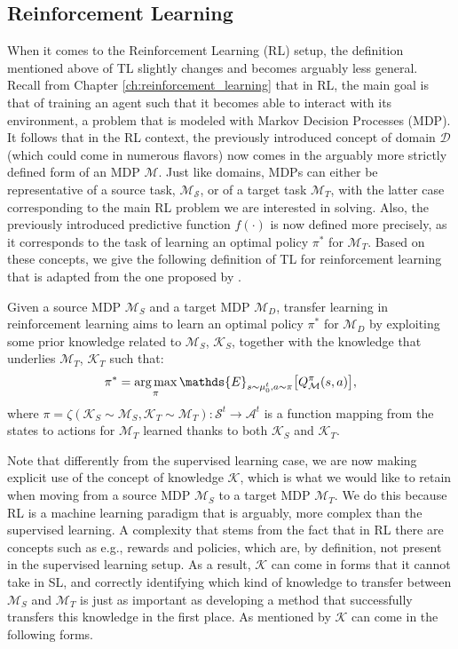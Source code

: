 \subsection{Reinforcement Learning}
\label{sec:reinforcement_learning_tl}
When it comes to the Reinforcement Learning (RL) setup, the definition mentioned above of TL slightly changes and becomes arguably less general. Recall from Chapter \ref{ch:reinforcement_learning} that in RL, the main goal is that of training an agent such that it becomes able to interact with its environment, a problem that is modeled with Markov Decision Processes (MDP). It follows that in the RL context, the previously introduced concept of domain $\mathcal{D}$ (which could come in numerous flavors) now comes in the arguably more strictly defined form of an MDP $\mathcal{M}$. Just like domains, MDPs can either be representative of a source task, $\mathcal{M_S}$, or of a target task $\mathcal{M}_T$, with the latter case corresponding to the main RL problem we are interested in solving. Also, the previously introduced predictive function $f(\cdot)$ is now defined more precisely, as it corresponds to the task of learning an optimal policy $\pi^*$ for $\mathcal{M}_T$. Based on these concepts, we give the following definition of TL for reinforcement learning that is adapted from the one proposed by \citet{zhu2020transfer}.

\begin{definition}
	Given a source MDP $\mathcal{M}_S$ and a target MDP $\mathcal{M}_D$, transfer learning in reinforcement learning aims to learn an optimal policy $\pi^{*}$ for $\mathcal{M}_D$ by exploiting some prior knowledge related to $\mathcal{M}_S$, $\mathcal{K}_S$, together with the knowledge that underlies $\mathcal{M}_T$, $\mathcal{K}_T$ such that:
	\begin{align}
		\pi^{*} = \argmax_{\pi} \mathds{E}_{s \sim\mu_{0}^{t},a\sim\pi}\bigl[Q^{\pi}_\mathcal{M}(s,a)\bigr],
	\end{align}
	where $\pi = \zeta(\mathcal{K}_S \sim \mathcal{M}_S, \mathcal{K}_T \sim \mathcal{M}_T): \mathcal{S}^t \rightarrow \mathcal{A}^t$ is a function mapping from the states to actions for $\mathcal{M}_T$ learned thanks to both $\mathcal{K}_S$ and $\mathcal{K}_T$.
\end{definition}

Note that differently from the supervised learning case, we are now making explicit use of the concept of knowledge $\mathcal{K}$, which is what we would like to retain when moving from a source MDP $\mathcal{M}_S$ to a target MDP $\mathcal{M}_T$. We do this because RL is a machine learning paradigm that is arguably, more complex than the supervised learning. A complexity that stems from the fact that in RL there are concepts such as e.g., rewards and policies, which are, by definition, not present in the supervised learning setup. As a result, $\mathcal{K}$ can come in forms that it cannot take in SL, and correctly identifying which kind of knowledge to transfer between $\mathcal{M}_S$ and $\mathcal{M}_T$ is just as important as developing a method that successfully transfers this knowledge in the first place. As mentioned by \citet{lazaric2012transfer} $\mathcal{K}$ can come in the following forms.

